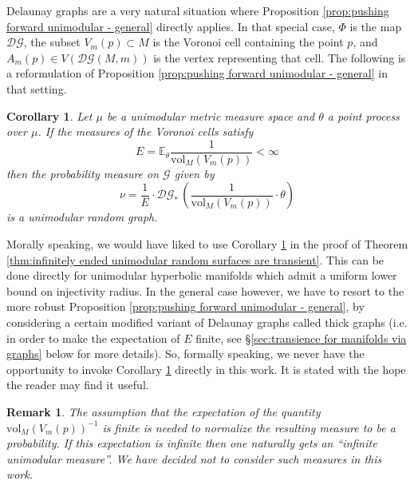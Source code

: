 \documentclass{amsart}
\newcommand{\EE}{\mathbb{E}}
\newcommand{\MM}{\mathbb{M}}
\newcommand{\MP}{\mathbb{PM}}
\newcommand{\Graphs}{\mathcal{G}}
\newcommand{\DelanGraph}{\mathcal{DG}}
\newcommand{\vol}{\mathrm{vol}}
\theoremstyle{plain}
\newtheorem{remark}[theorem]{Remark}
\newtheorem{cor}[theorem]{Corollary}
\numberwithin{equation}{section}
\theoremstyle{definition}
\begin{document}
Delaunay graphs are a very natural situation where  Proposition \ref{prop:pushing forward unimodular - general}  directly applies. In that special case, $\Phi$ is the map $\DelanGraph$, the subset $V_m(p) \subset M$ is the Voronoi cell containing the point $p$, and $A_m(p) \in  V(\DelanGraph(M,m))$ is the vertex representing that cell. The following is a reformulation of Proposition \ref{prop:pushing forward unimodular - general} in that setting.

\begin{cor}
\label{cor:unimodular graph from unimodular space - delaunay}
Let $\mu$ be a unimodular metric measure space and $\theta$ a point process over $\mu$. If the measures of the Voronoi cells satisfy
\begin{equation}
E = \EE_\theta \frac{1}{\vol_M(V_m(p))} < \infty
\end{equation}
then the probability measure on $\Graphs$ given by
\begin{equation}
\nu = \frac{1}{E} \cdot \DelanGraph_* \, \left(\frac{1}{\vol_M(V_m(p))} \cdot\theta \right)
\end{equation} 
is a unimodular random graph. 
\end{cor}

Morally speaking, we would have liked to use Corollary \ref{cor:unimodular graph from unimodular space - delaunay} in the proof of Theorem \ref{thm:infinitely ended unimodular random surfaces are transient}.  This can be done directly for unimodular hyperbolic manifolds which admit a uniform lower bound on injectivity radius. In the general case however, we  have to resort to the more robust Proposition \ref{prop:pushing forward unimodular - general}, by considering a certain modified variant of Delaunay graphs called thick graphs (i.e. in order to make the expectation of $E$ finite, see \S\ref{sec:transience for manifolds via graphs} below for more details). So, formally speaking, we never have the opportunity to invoke Corollary \ref{cor:unimodular graph from unimodular space - delaunay} directly in this work. It is stated with the hope the reader may find it useful.



    
\begin{remark}
The assumption that the expectation of the quantity $\vol_M(V_m(p))^{-1}$ is finite is needed to normalize the resulting measure to be a probability. If this expectation is infinite then  one  naturally gets an \enquote{infinite unimodular measure}. We have decided not to consider such measures in this work.
\end{remark} 
\end{document}
